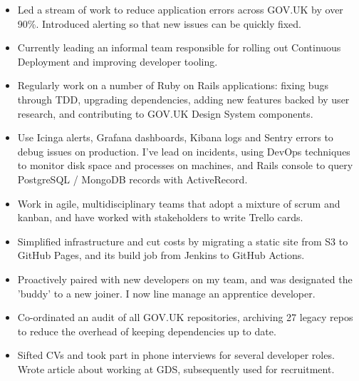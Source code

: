 \documentclass[10pt,a4paper,ragged2e,withhyper]{altacv}
\begin{document}
\begin{paracol}{2}


\begin{itemize}
    \item Led a stream of work to reduce application errors across GOV.UK by over 90\%. Introduced alerting so that new issues can be quickly fixed.
    \item Currently leading an informal team responsible for rolling out Continuous Deployment and improving developer tooling.
    \item Regularly work on a number of Ruby on Rails applications: fixing bugs through TDD, upgrading dependencies, adding new features backed by user research, and contributing to GOV.UK Design System components.
    \item Use Icinga alerts, Grafana dashboards, Kibana logs and Sentry errors to debug issues on production. I've lead on incidents, using DevOps techniques to monitor disk space and processes on machines, and Rails console to query PostgreSQL / MongoDB records with ActiveRecord.
    \item Work in agile, multidisciplinary teams that adopt a mixture of scrum and kanban, and have worked with stakeholders to write Trello cards.
    \item Simplified infrastructure and cut costs by migrating a static site from S3 to GitHub Pages, and its build job from Jenkins to GitHub Actions.
    \item Proactively paired with new developers on my team, and was designated the 'buddy' to a new joiner. I now line manage an apprentice developer.
    \item Co-ordinated an audit of all GOV.UK repositories, archiving 27 legacy repos to reduce the overhead of keeping dependencies up to date.
    \item Sifted CVs and took part in phone interviews for several developer roles. Wrote article about working at GDS, subsequently used for recruitment.
\end{itemize}

\divider


\end{paracol}
\end{document}
